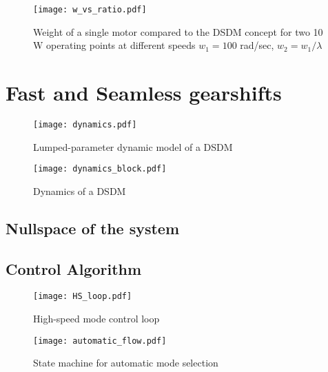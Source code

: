 \begin{figure}[H]
	\centering
		\texttt{[image: w\_vs\_ratio.pdf]}
	\caption{Weight of a single motor compared to the DSDM concept for two 10 W operating points at different speeds $w_1=100$ rad/sec, $w_2 = w_1 / \lambda$}
	\label{fig:1vs2}
\end{figure}


\section{Fast and Seamless gearshifts}
\label{sec:FastAndSeamlessGearshifts}

\begin{figure}[H]
	\centering
		\texttt{[image: dynamics.pdf]}
	\caption{Lumped-parameter dynamic model of a DSDM}
	\label{fig:dynamics}
\end{figure}

\begin{figure}[H]
	\centering
		\texttt{[image: dynamics\_block.pdf]}
	\caption{Dynamics of a DSDM}
	\label{fig:dynamics_block}
\end{figure}

\subsection{Nullspace of the system}

\subsection{Control Algorithm}


\begin{figure}[H]
	\centering
		\texttt{[image: HS\_loop.pdf]}
	\caption{High-speed mode control loop}
	\label{fig:HS_loop}
\end{figure}

\begin{figure}[H]
	\centering
		\texttt{[image: automatic\_flow.pdf]}
	\caption{State machine for automatic mode selection}
	\label{fig:automaticflow}
\end{figure}


